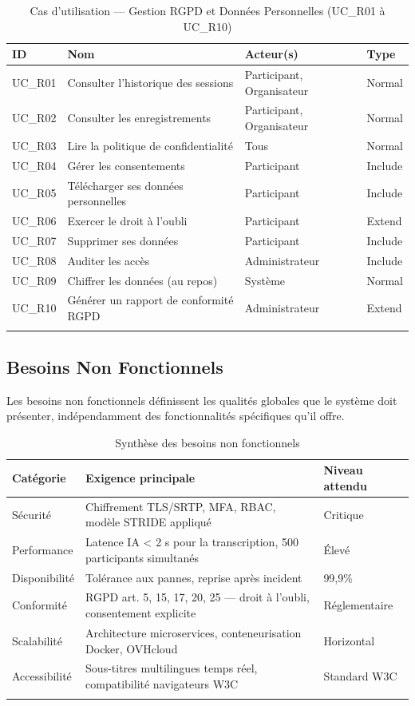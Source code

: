 \begin{longtable}{|m{1.5cm}|m{6cm}|m{3.5cm}|m{2cm}|}
\hline
\textbf{ID} & \textbf{Nom} & \textbf{Acteur(s)} & \textbf{Type} \\
\hline
\endhead
\endfoot
\endlastfoot
\hline
UC\_R01 & Consulter l'historique des sessions & Participant, Organisateur & Normal \\
\hline
UC\_R02 & Consulter les enregistrements & Participant, Organisateur & Normal \\
\hline
UC\_R03 & Lire la politique de confidentialité & Tous & Normal \\
\hline
UC\_R04 & Gérer les consentements & Participant & Include \\
\hline
UC\_R05 & Télécharger ses données personnelles & Participant & Include \\
\hline
UC\_R06 & Exercer le droit à l'oubli & Participant & Extend \\
\hline
UC\_R07 & Supprimer ses données & Participant & Include \\
\hline
UC\_R08 & Auditer les accès & Administrateur & Include \\
\hline
UC\_R09 & Chiffrer les données (au repos) & Système & Normal \\
\hline
UC\_R10 & Générer un rapport de conformité RGPD & Administrateur & Extend \\
\hline
\captionsetup{justification=centering,margin=2cm}
\caption{Cas d'utilisation — Gestion RGPD et Données Personnelles (UC\_R01 à UC\_R10)}
\label{tab:uc_rgpd}
\end{longtable}

\subsection{Besoins Non Fonctionnels}
Les besoins non fonctionnels définissent les qualités globales que le système doit présenter, indépendamment des fonctionnalités spécifiques qu'il offre.

\begin{longtable}{|m{3cm}|m{6cm}|m{3cm}|}
\hline
\textbf{Catégorie} & \textbf{Exigence principale} & \textbf{Niveau attendu} \\
\hline
\endhead
\endfoot
\endlastfoot
\hline
Sécurité & Chiffrement TLS/SRTP, MFA, RBAC, modèle STRIDE appliqué & Critique \\
\hline
Performance & Latence IA < 2 s pour la transcription, 500 participants simultanés & Élevé \\
\hline
Disponibilité & Tolérance aux pannes, reprise après incident & 99,9\% \\
\hline
Conformité & RGPD art. 5, 15, 17, 20, 25 — droit à l'oubli, consentement explicite & Réglementaire \\
\hline
Scalabilité & Architecture microservices, conteneurisation Docker, OVHcloud & Horizontal \\
\hline
Accessibilité & Sous-titres multilingues temps réel, compatibilité navigateurs W3C & Standard W3C \\
\hline
\captionsetup{justification=centering,margin=2cm}
\caption{Synthèse des besoins non fonctionnels}
\label{tab:nfr}
\end{longtable}

